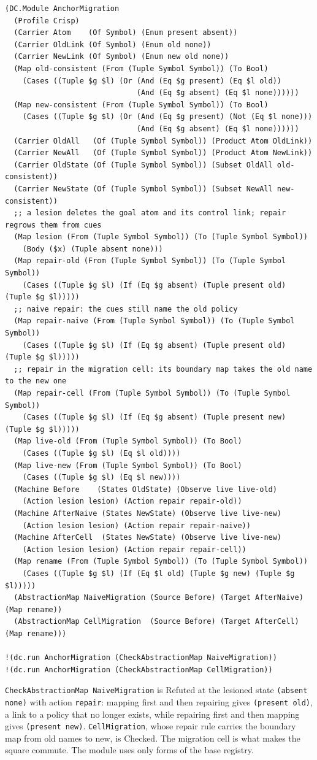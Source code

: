 \documentclass[11pt]{article}
\newcommand{\code}[1]{\texttt{#1}}
\theoremstyle{definition}
\theoremstyle{plain}
\begin{document}
\begin{lstlisting}[style=mettamod]
(DC.Module AnchorMigration
  (Profile Crisp)
  (Carrier Atom    (Of Symbol) (Enum present absent))
  (Carrier OldLink (Of Symbol) (Enum old none))
  (Carrier NewLink (Of Symbol) (Enum new old none))
  (Map old-consistent (From (Tuple Symbol Symbol)) (To Bool)
    (Cases ((Tuple $g $l) (Or (And (Eq $g present) (Eq $l old))
                              (And (Eq $g absent) (Eq $l none))))))
  (Map new-consistent (From (Tuple Symbol Symbol)) (To Bool)
    (Cases ((Tuple $g $l) (Or (And (Eq $g present) (Not (Eq $l none)))
                              (And (Eq $g absent) (Eq $l none))))))
  (Carrier OldAll   (Of (Tuple Symbol Symbol)) (Product Atom OldLink))
  (Carrier NewAll   (Of (Tuple Symbol Symbol)) (Product Atom NewLink))
  (Carrier OldState (Of (Tuple Symbol Symbol)) (Subset OldAll old-consistent))
  (Carrier NewState (Of (Tuple Symbol Symbol)) (Subset NewAll new-consistent))
  ;; a lesion deletes the goal atom and its control link; repair regrows them from cues
  (Map lesion (From (Tuple Symbol Symbol)) (To (Tuple Symbol Symbol))
    (Body ($x) (Tuple absent none)))
  (Map repair-old (From (Tuple Symbol Symbol)) (To (Tuple Symbol Symbol))
    (Cases ((Tuple $g $l) (If (Eq $g absent) (Tuple present old) (Tuple $g $l)))))
  ;; naive repair: the cues still name the old policy
  (Map repair-naive (From (Tuple Symbol Symbol)) (To (Tuple Symbol Symbol))
    (Cases ((Tuple $g $l) (If (Eq $g absent) (Tuple present old) (Tuple $g $l)))))
  ;; repair in the migration cell: its boundary map takes the old name to the new one
  (Map repair-cell (From (Tuple Symbol Symbol)) (To (Tuple Symbol Symbol))
    (Cases ((Tuple $g $l) (If (Eq $g absent) (Tuple present new) (Tuple $g $l)))))
  (Map live-old (From (Tuple Symbol Symbol)) (To Bool)
    (Cases ((Tuple $g $l) (Eq $l old))))
  (Map live-new (From (Tuple Symbol Symbol)) (To Bool)
    (Cases ((Tuple $g $l) (Eq $l new))))
  (Machine Before    (States OldState) (Observe live live-old)
    (Action lesion lesion) (Action repair repair-old))
  (Machine AfterNaive (States NewState) (Observe live live-new)
    (Action lesion lesion) (Action repair repair-naive))
  (Machine AfterCell  (States NewState) (Observe live live-new)
    (Action lesion lesion) (Action repair repair-cell))
  (Map rename (From (Tuple Symbol Symbol)) (To (Tuple Symbol Symbol))
    (Cases ((Tuple $g $l) (If (Eq $l old) (Tuple $g new) (Tuple $g $l)))))
  (AbstractionMap NaiveMigration (Source Before) (Target AfterNaive) (Map rename))
  (AbstractionMap CellMigration  (Source Before) (Target AfterCell)  (Map rename)))

!(dc.run AnchorMigration (CheckAbstractionMap NaiveMigration))
!(dc.run AnchorMigration (CheckAbstractionMap CellMigration))
\end{lstlisting}
\code{CheckAbstractionMap NaiveMigration} is Refuted at the lesioned state \code{(absent none)}
with action \code{repair}: mapping first and then repairing gives \code{(present old)}, a link to a
policy that no longer exists, while repairing first and then mapping gives \code{(present new)}.
\code{CellMigration}, whose repair rule carries the boundary map from old names to new, is Checked.
The migration cell is what makes the square commute. The module uses only forms of the
base registry.
\end{document}
